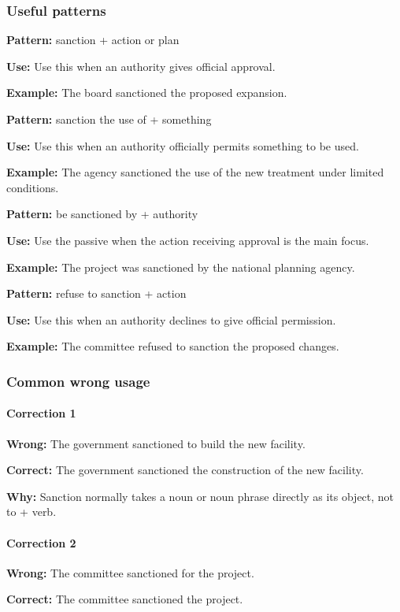 \documentclass[11pt]{article}
\begin{document}
\subsubsection{Useful patterns}
\textbf{Pattern:} sanction + action or plan

\textbf{Use:} Use this when an authority gives official approval.

\textbf{Example:} The board sanctioned the proposed expansion.

\textbf{Pattern:} sanction the use of + something

\textbf{Use:} Use this when an authority officially permits something to be used.

\textbf{Example:} The agency sanctioned the use of the new treatment under limited conditions.

\textbf{Pattern:} be sanctioned by + authority

\textbf{Use:} Use the passive when the action receiving approval is the main focus.

\textbf{Example:} The project was sanctioned by the national planning agency.

\textbf{Pattern:} refuse to sanction + action

\textbf{Use:} Use this when an authority declines to give official permission.

\textbf{Example:} The committee refused to sanction the proposed changes.

\subsubsection{Common wrong usage}
\paragraph{Correction 1}
\textbf{Wrong:} The government sanctioned to build the new facility.

\textbf{Correct:} The government sanctioned the construction of the new facility.

\textbf{Why:} Sanction normally takes a noun or noun phrase directly as its object, not to + verb.

\paragraph{Correction 2}
\textbf{Wrong:} The committee sanctioned for the project.

\textbf{Correct:} The committee sanctioned the project.
\end{document}
